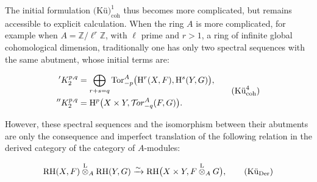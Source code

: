 The initial formulation $\text{(Kü)}_{\mathrm{coh}}^{1}$ thus
becomes more complicated, but remains accessible to explicit calculation.
When the ring $A$ is more complicated, for example when
$A=\mathbb Z/\ell^r\mathbb Z$, with $\ell$ prime and $r>1$, a ring of infinite
global cohomological dimension, traditionally one has only two spectral
sequences with the same abutment, whose initial terms are:

\begin{equation}
\begin{aligned}
{}'K_2^{p,q}
  &=\bigoplus_{r+s=q}
    \operatorname{Tor}_{-p}^{A}
    \bigl(\mathrm H^r(X,F),\mathrm H^s(Y,G)\bigr), \\
{}''K_2^{p,q}
  &=\mathrm H^p\bigl(X\times Y,\mathcal T\!or_{-q}^{A}(F,G)\bigr).
\end{aligned}
\tag{$\text{Kü}_{\mathrm{coh}}^{4}$}
\end{equation}

However, these spectral sequences and the isomorphism between their
abutments are only the consequence and imperfect translation of the
following relation in the derived category of the category of $A$-modules:

\begin{equation}
\mathrm{RH}(X,F)\overset{\mathrm L}{\otimes}_A\mathrm{RH}(Y,G)
\xrightarrow{\sim}
\mathrm{RH}\bigl(X\times Y,F\overset{\mathrm L}{\otimes}_A G\bigr),
\tag{$\text{Kü}_{\mathrm{Der}}$}
\end{equation}
